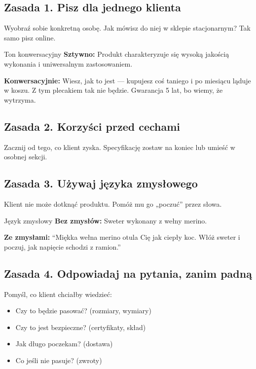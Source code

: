 \documentclass[
  12pt,
  a4paper,
  twoside,
  openright,
  12pt,
  DIV=12,
  BCOR=12mm]{scrbook}
\providecommand{\tightlist}{%
  \setlength{\itemsep}{0pt}\setlength{\parskip}{0pt}}\usepackage{longtable,booktabs,array}
\begin{document}
\subsection{Zasada 1. Pisz dla jednego
klienta}\label{zasada-1.-pisz-dla-jednego-klienta}

Wyobraź sobie konkretną osobę. Jak mówisz do niej w sklepie
stacjonarnym? Tak samo pisz online.

\begin{przyklad}{Ton konwersacyjny}
\textbf{Sztywno:}
Produkt charakteryzuje się wysoką jakością wykonania i uniwersalnym zastosowaniem.

\textbf{Konwersacyjnie:}
Wiesz, jak to jest --- kupujesz coś taniego i po miesiącu ląduje w koszu. Z tym plecakiem tak nie będzie. Gwarancja 5 lat, bo wiemy, że wytrzyma.
\end{przyklad}

\subsection{Zasada 2. Korzyści przed
cechami}\label{zasada-2.-korzyux15bci-przed-cechami}

Zacznij od tego, co klient zyska. Specyfikację zostaw na koniec lub
umieść w osobnej sekcji.

\subsection{Zasada 3. Używaj języka
zmysłowego}\label{zasada-3.-uux17cywaj-jux119zyka-zmysux142owego}

Klient nie może dotknąć produktu. Pomóż mu go „poczuć'' przez słowa.

\begin{przyklad}{Język zmysłowy}
\textbf{Bez zmysłów:}
Sweter wykonany z wełny merino.

\textbf{Ze zmysłami:}
``Miękka wełna merino otula Cię jak ciepły koc. Włóż sweter i poczuj, jak napięcie schodzi z ramion.''
\end{przyklad}

\subsection{Zasada 4. Odpowiadaj na pytania, zanim
padną}\label{zasada-4.-odpowiadaj-na-pytania-zanim-padnux105}

Pomyśl, co klient chciałby wiedzieć:

\begin{itemize}
\tightlist
\item
  Czy to będzie pasować? (rozmiary, wymiary)
\item
  Czy to jest bezpieczne? (certyfikaty, skład)
\item
  Jak długo poczekam? (dostawa)
\item
  Co jeśli nie pasuje? (zwroty)
\end{itemize}
\end{document}
